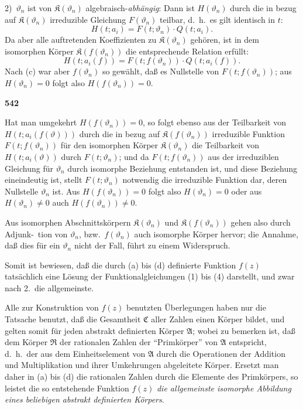\documentclass[12pt,a4paper]{article}
\begin{document}
2)\ $\vartheta_n$ ist von $\mathfrak{K}(\vartheta_n)$ algebraisch-\emph{abh\"angig}: Dann ist $H(\vartheta_n)$ durch die in bezug auf $\mathfrak{K}(\vartheta_n)$ irreduzible Gleichung $F(\vartheta_n)$ teilbar, d.\ h.\ es gilt identisch in $t$:
\[H(t; a_i) = F(t; \vartheta_n) \cdot Q(t; a_i).\]
Da aber alle auftretenden Koeffizienten zu $\mathfrak{K}(\vartheta_n)$ geh\"oren, ist in dem isomorphen K\"orper $\mathfrak{K}(f(\vartheta_n))$ die entsprechende Relation erf\"ullt:
\[H(t; a_i(f)) = F(t; f(\vartheta_n)) \cdot Q(t; a_i(f)).\]
Nach (c) war aber $f(\vartheta_n)$ so gew\"ahlt, da\ss{} es Nullstelle von $F(t; f(\vartheta_n))$; aus $H(\vartheta_n) = 0$ folgt also $H(f(\vartheta_n)) = 0$.

\newpage
\begin{center}
\textbf{542}
\end{center}

Hat man umgekehrt $H(f(\vartheta_n)) = 0$, so folgt ebenso aus der Teilbarkeit von $H(t; a_i(f(\vartheta)))$ durch die in bezug auf $\mathfrak{K}(f(\vartheta_n))$ irreduzible Funktion $F(t; f(\vartheta_n))$ f\"ur den isomorphen K\"orper $\mathfrak{K}(\vartheta_n)$ die Teilbarkeit von $H(t; a_i(\vartheta))$ durch $F(t; \vartheta_n)$; und da $F(t; f(\vartheta_n))$ aus der irreduziblen Gleichung f\"ur $\vartheta_n$ durch isomorphe Beziehung entstanden ist, und diese Beziehung eineindeutig ist, stellt $F(t; \vartheta_n)$ notwendig die irreduzible Funktion dar, deren Nullstelle $\vartheta_n$ ist. Aus $H(f(\vartheta_n)) = 0$ folgt also $H(\vartheta_n) = 0$ oder aus $H(\vartheta_n) \neq 0$ auch $H(f(\vartheta_n)) \neq 0$.

Aus isomorphen Abschnittsk\"orpern $\mathfrak{K}(\vartheta_n)$ und $\mathfrak{K}(f(\vartheta_n))$ gehen also durch Adjunk-\ tion von $\vartheta_n$, bzw.\ $f(\vartheta_n)$ auch isomorphe K\"orper hervor; die Annahme, da\ss{} dies f\"ur ein $\vartheta_n$ nicht der Fall, f\"uhrt zu einem Widerspruch.

Somit ist bewiesen, da\ss{} die durch (a) bis (d) definierte Funktion $f(z)$ tats\"achlich eine L\"osung der Funktionalgleichungen (1) bis (4) darstellt, und zwar nach 2.\ die allgemeinste.

Alle zur Konstruktion von $f(z)$ benutzten \"Uberlegungen haben nur die Tatsache benutzt, da\ss{} die Gesamtheit $\mathfrak{C}$ aller Zahlen einen K\"orper bildet, und gelten somit f\"ur jeden abstrakt definierten K\"orper $\mathfrak{A}$; wobei zu bemerken ist, da\ss{} dem K\"orper $\mathfrak{R}$ der rationalen Zahlen der ``Primk\"orper'' von $\mathfrak{A}$ entspricht, d.\ h.\ der aus dem Einheitselement von $\mathfrak{A}$ durch die Operationen der Addition und Multiplikation und ihrer Umkehrungen abgeleitete K\"orper. Ersetzt man daher in (a) bis (d) die rationalen Zahlen durch die Elemente des Primk\"orpers, so leistet die so entstehende Funktion $f(z)$ \emph{die allgemeinste isomorphe Abbildung eines beliebigen abstrakt definierten K\"orpers}.
\end{document}
